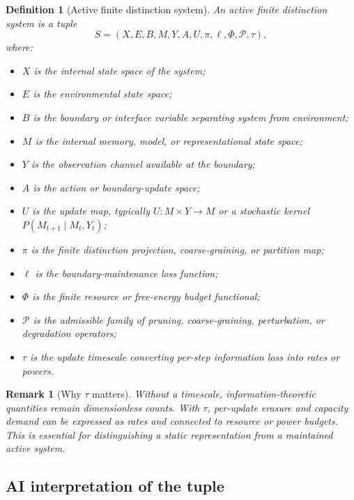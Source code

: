 \documentclass[10pt,a4paper,twocolumn,aps,prl]{revtex4-2}
\newtheorem{definition}{Definition}
\newtheorem{remark}{Remark}
\begin{document}
\begin{definition}[Active finite distinction system]
An \emph{active finite distinction system} is a tuple
\begin{equation}
S=(X,E,B,M,Y,A,U,\pi,\ell,\Phi,\mathcal{P},\tau),
\label{eq:fds-tuple}
\end{equation}
where:
\begin{itemize}[leftmargin=2em]
    \item $X$ is the internal state space of the system;
    \item $E$ is the environmental state space;
    \item $B$ is the boundary or interface variable separating system from environment;
    \item $M$ is the internal memory, model, or representational state space;
    \item $Y$ is the observation channel available at the boundary;
    \item $A$ is the action or boundary-update space;
    \item $U$ is the update map, typically $U:M\times Y\to M$ or a stochastic kernel $P(M_{t+1}\mid M_t,Y_t)$;
    \item $\pi$ is the finite distinction projection, coarse-graining, or partition map;
    \item $\ell$ is the boundary-maintenance loss function;
    \item $\Phi$ is the finite resource or free-energy budget functional;
    \item $\mathcal{P}$ is the admissible family of pruning, coarse-graining, perturbation, or degradation operators;
    \item $\tau$ is the update timescale converting per-step information loss into rates or powers.
\end{itemize}
\end{definition}

\begin{remark}[Why $\tau$ matters]
Without a timescale, information-theoretic quantities remain dimensionless counts. With $\tau$, per-update erasure and capacity demand can be expressed as rates and connected to resource or power budgets. This is essential for distinguishing a static representation from a maintained active system.
\end{remark}

\subsection{AI interpretation of the tuple}
\end{document}
